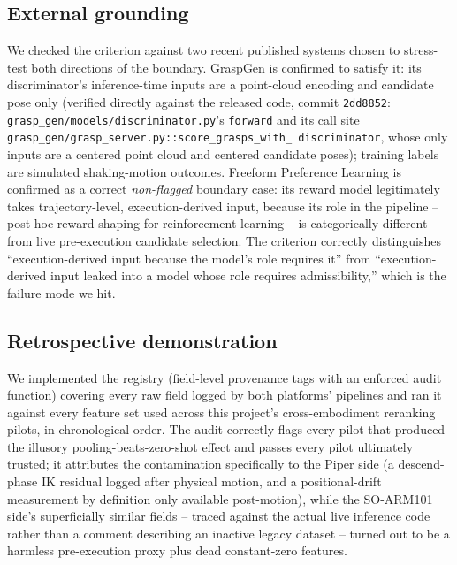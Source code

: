 \documentclass[journal]{IEEEtran}
\begin{document}
\subsection{External grounding}
\label{sec:external}

We checked the criterion against two recent published systems chosen to
stress-test both directions of the boundary. GraspGen \cite{graspgen2025}
is confirmed to satisfy it: its discriminator's inference-time inputs are
a point-cloud encoding and candidate pose only (verified directly against
the released code, commit \texttt{2dd8852}:
\texttt{grasp\_gen/models/discriminator.py}'s \texttt{forward} and its
call site \texttt{grasp\_gen/grasp\_server.py::score\_grasps\_with\_%
discriminator}, whose only inputs are a centered point cloud and centered
candidate poses); training labels are simulated shaking-motion outcomes.
Freeform Preference Learning
\cite{fpl2026} is confirmed as a correct \emph{non-flagged} boundary case:
its reward model legitimately takes trajectory-level, execution-derived
input, because its role in the pipeline -- post-hoc reward shaping for
reinforcement learning -- is categorically different from live
pre-execution candidate selection. The criterion correctly distinguishes
``execution-derived input because the model's role requires it'' from
``execution-derived input leaked into a model whose role requires
admissibility,'' which is the failure mode we hit.

\subsection{Retrospective demonstration}
\label{sec:retro}

We implemented the registry (field-level provenance tags with an
enforced audit function) covering every raw field logged by both
platforms' pipelines and ran it against every feature set used across
this project's cross-embodiment reranking pilots, in chronological order.
The audit correctly flags every pilot that produced the illusory
pooling-beats-zero-shot effect and passes every pilot ultimately trusted;
it attributes the contamination specifically to the Piper side (a
descend-phase IK residual logged after physical motion, and a
positional-drift measurement by definition only available post-motion),
while the SO-ARM101 side's superficially similar fields -- traced against
the actual live inference code rather than a comment describing an
inactive legacy dataset -- turned out to be a harmless pre-execution proxy
plus dead constant-zero features.
\end{document}
